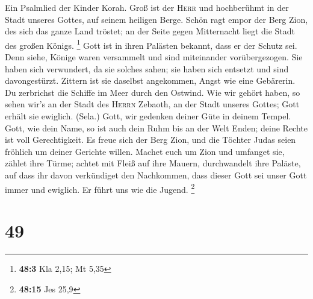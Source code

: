  Ein Psalmlied der Kinder Korah.  Groß ist
der \textsc{Herr} und hochberühmt in der Stadt unseres Gottes, auf
seinem heiligen Berge.  Schön ragt empor der Berg Zion,
des sich das ganze Land tröstet; an der Seite gegen Mitternacht liegt
die Stadt des großen Königs. \footnote{\textbf{48:3} Kla 2,15; Mt 5,35}
 Gott ist in ihren Palästen bekannt, dass er der Schutz
sei.  Denn siehe, Könige waren versammelt und sind
miteinander vorübergezogen.  Sie haben sich verwundert, da
sie solches sahen; sie haben sich entsetzt und sind davongestürzt.
 Zittern ist sie daselbst angekommen, Angst wie eine
Gebärerin.  Du zerbrichst die Schiffe im Meer durch den
Ostwind.  Wie wir gehört haben, so sehen wir's an der
Stadt des \textsc{Herrn} Zebaoth, an der Stadt unseres Gottes; Gott
erhält sie ewiglich. (Sela.)  Gott, wir gedenken deiner
Güte in deinem Tempel.  Gott, wie dein Name, so ist auch
dein Ruhm bis an der Welt Enden; deine Rechte ist voll Gerechtigkeit.
 Es freue sich der Berg Zion, und die Töchter Judas seien
fröhlich um deiner Gerichte willen.  Machet euch um Zion
und umfanget sie, zählet ihre Türme;  achtet mit Fleiß
auf ihre Mauern, durchwandelt ihre Paläste, auf dass ihr davon
verkündiget den Nachkommen,  dass dieser Gott sei unser
Gott immer und ewiglich. Er führt uns wie die Jugend. \footnote{\textbf{48:15}
  Jes 25,9}

\hypertarget{section-21}{%
\section{49}\label{section-21}}

